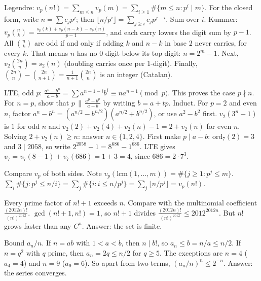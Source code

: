 \documentclass[11pt,a4paper]{article}
\begin{document}

 Legendre: $v_p(n!)=\sum_{m\le n}v_p(m)=\sum_{i\ge1}\#\{m\le n:p^i\mid m\}$. For the closed form, write $n=\sum c_jp^j$; then $\lfloor n/p^i\rfloor=\sum_{j\ge i}c_jp^{j-i}$. Sum over $i$.
 Kummer: $v_p\binom nk=\frac{s_p(k)+s_p(n-k)-s_p(n)}{p-1}$, and each carry lowers the digit sum by $p-1$.
 All $\binom nk$ are odd if and only if adding $k$ and $n-k$ in base $2$ never carries, for every $k$. That means $n$ has no $0$ digit below its top digit: $n=2^m-1$. Next, $v_2\binom{2n}n=s_2(n)$ (doubling carries once per $1$-digit). Finally, $\binom{2n}{n}-\binom{2n}{n+1}=\frac{1}{n+1}\binom{2n}n$ is an integer (Catalan).

 LTE, odd $p$: $\frac{a^n-b^n}{a-b}=\sum a^{n-1-i}b^i\equiv na^{n-1}\pmod p$. This proves the case $p\nmid n$. For $n=p$, show that $p\,\|\,\frac{a^p-b^p}{a-b}$ by writing $b=a+tp$. Induct. For $p=2$ and even $n$, factor $a^n-b^n=(a^{n/2}-b^{n/2})(a^{n/2}+b^{n/2})$, or use $a^2-b^2$ first.
 $v_2(3^n-1)$ is $1$ for odd $n$ and $v_2(2)+v_2(4)+v_2(n)-1=2+v_2(n)$ for even $n$. Solving $2+v_2(n)\ge n$: answer $n\in\{1,2,4\}$.
 First make $p\mid a-b$: $\mathrm{ord}_7(2)=3$ and $3\mid2058$, so write $2^{2058}-1=8^{686}-1^{686}$. LTE gives $v_7=v_7(8-1)+v_7(686)=1+3=4$, since $686=2\cdot7^3$.

 Compare $v_p$ of both sides. Note $v_p(\mathrm{lcm}(1,\dots,m))=\#\{j\ge1:p^j\le m\}$.
 $\sum_i\#\{j:p^j\le n/i\}=\sum_j\#\{i:i\le n/p^j\}=\sum_j\lfloor n/p^j\rfloor=v_p(n!)$.

 Every prime factor of $n!+1$ exceeds $n$. Compare with the multinomial coefficient $\frac{(2012n)!}{(n!)^{2012}}$.
 $\gcd(n!+1,n!)=1$, so $n!+1$ divides $\frac{(2012n)!}{(n!)^{2012}}\le2012^{2012n}$. But $n!$ grows faster than any $C^n$. Answer: the set is finite.

 Bound $a_n/n$. If $n=ab$ with $1<a<b$, then $n\mid b!$, so $a_n\le b=n/a\le n/2$.
 If $n=q^2$ with $q$ prime, then $a_n=2q\le n/2$ for $q\ge5$. The exceptions are $n=4$ ($a_4=4$) and $n=9$ ($a_9=6$).
 So apart from two terms, $(a_n/n)^n\le2^{-n}$. Answer: the series converges.
\end{document}
